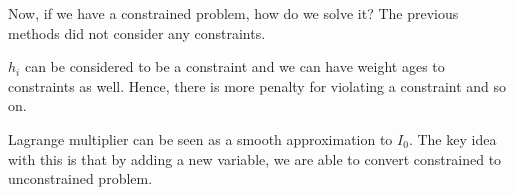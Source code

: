 Now, if we have a constrained problem, how do we solve it? The previous methods did not consider any constraints.

$h_i$ can be considered to be a constraint and we can have weight ages to constraints as well. Hence, there is more penalty for violating a constraint and so on.

Lagrange multiplier can be seen as a smooth approximation to $I_0$. The key idea with this is that by adding a new variable, we are able to convert constrained to unconstrained problem.

